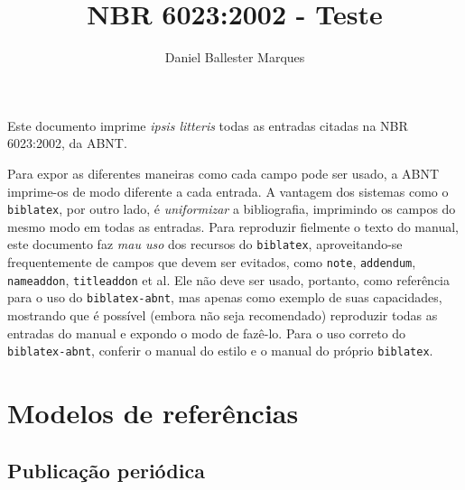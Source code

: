 \documentclass[a4paper]{article}
\title{NBR 6023:2002 - Teste}
\author{Daniel Ballester Marques}
\let\origsection\section
\renewcommand\section{\clearpage\origsection}
\begin{document}
\color{red!50}

\maketitle

Este documento imprime \textit{ipsis litteris} todas as entradas citadas na
NBR 6023:2002, da ABNT.

Para expor as diferentes maneiras como cada campo pode ser usado, a ABNT
imprime-os de modo diferente a cada entrada. A vantagem dos sistemas como
o \texttt{biblatex}, por outro lado, é \emph{uniformizar} a bibliografia,
imprimindo os campos do mesmo modo em todas as entradas. Para reproduzir
fielmente o texto do manual, este documento faz \emph{mau uso} dos recursos do
\texttt{biblatex}, aproveitando-se frequentemente de campos que devem ser
evitados, como \texttt{note}, \texttt{addendum}, \texttt{nameaddon},
\texttt{titleaddon} et al. Ele não deve ser usado, portanto, como referência
para o uso do \texttt{biblatex-abnt}, mas apenas como exemplo de suas
capacidades, mostrando que é possível (embora não seja recomendado) reproduzir
todas as entradas do manual e expondo o modo de fazê-lo. Para o uso correto do
\texttt{biblatex-abnt}, conferir o manual do estilo e o manual do próprio
\texttt{biblatex}.

\tableofcontents

\nocite{*}


\setcounter{section}{6}

\section{Modelos de referências}


	\printbibliography[keyword=7.1, title={Monografia no todo}]

	\printbibliography[keyword=7.2,
    title={Monografia no todo em meio eletrônico}]

	\printbibliography[keyword=7.3, title={Parte de monografia}]

	\printbibliography[keyword=7.4,
    title={Parte de monografia em meio eletrônico}]

	\subsection{Publicação periódica}

	  \printbibliography[heading=subbib, keyword=7.5.1,
      title={Publicação periódica como um todo}]
	  \printbibliography[heading=subbib, keyword=7.5.2,
      title={Partes de revista, boletim etc.}]
	  \printbibliography[heading=subbib, keyword=7.5.3,
      title={Artigo e/ou matéria de revista, boletim etc.}]
	  \printbibliography[heading=subbib, keyword=7.5.4,
      title={Artigo e/ou matéria de revista,
             boletim etc.\ em meio eletrônico}]
	  \printbibliography[heading=subbib, keyword=7.5.5,
      title={Artigo e/ou matéria de jornal}]
\end{document}
